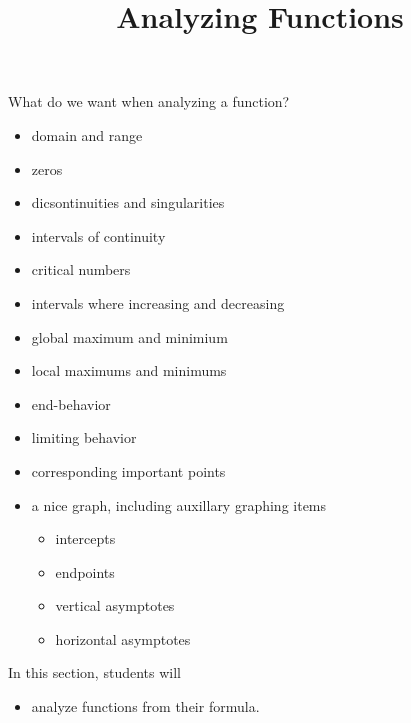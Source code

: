 \documentclass{ximera}
\title{Analyzing Functions}
\begin{document}
\begin{abstract}
%
\end{abstract}
\maketitle






What do we want when analyzing a function?


\begin{itemize}
\item domain and range
\item zeros 
\item dicsontinuities and singularities
\item intervals of continuity
\item critical numbers
\item intervals where increasing and decreasing
\item global maximum and minimium
\item local maximums and minimums
\item end-behavior
\item limiting behavior
\item corresponding important points
\item a nice graph, including auxillary graphing items
\begin{itemize}
	\item intercepts
	\item endpoints
	\item vertical asymptotes
	\item horizontal asymptotes
\end{itemize}
\end{itemize}




\begin{sectionOutcomes}
In this section, students will 

\begin{itemize}
\item analyze functions from their formula.
\end{itemize}
\end{sectionOutcomes}
\end{document}
